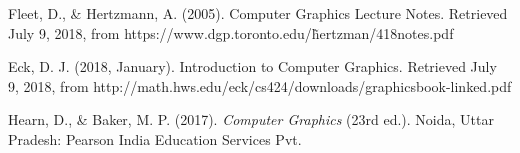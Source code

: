 \documentclass[12pt, a4paper, titlepage]{article}
\begin{document}
\begin{thebibliography}{9}

Fleet, D., \& Hertzmann, A. (2005). Computer Graphics Lecture Notes. Retrieved July 9, 2018, from https://www.dgp.toronto.edu/\~hertzman/418notes.pdf
 
Eck, D. J. (2018, January). Introduction to Computer Graphics. Retrieved July 9, 2018, from http://math.hws.edu/eck/cs424/downloads/graphicsbook-linked.pdf

Hearn, D., \& Baker, M. P. (2017). \textit{Computer Graphics} (23rd ed.). Noida, Uttar Pradesh: Pearson India Education Services Pvt.

\end{thebibliography}
\end{document}
